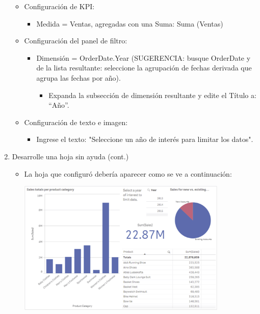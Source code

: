 \documentclass[12pt,letterpaper]{article}
\begin{document}
\begin{enumerate}
\begin{itemize}
\begin{itemize}
        \end{itemize}   
        \item Configuración de KPI:
        \begin{itemize}
            \item Medida = Ventas, agregadas con una Suma: Suma (Ventas)
        \end{itemize} 
        \item Configuración del panel de filtro:
        \begin{itemize}    
            \item Dimensión = OrderDate.Year (SUGERENCIA: busque OrderDate y de la lista resultante: seleccione la agrupación de fechas derivada que agrupa las fechas por año).
            \begin{itemize}      
                \item Expanda la subsección de dimensión resultante y edite el Título a: “Año”.
            \end{itemize} 
        \end{itemize} 
        \item Configuración de texto e imagen:
        \begin{itemize}  
            \item Ingrese el texto: "Seleccione un año de interés para limitar los datos".
        \end{itemize} 
    \end{itemize}  
    \item Desarrolle una hoja sin ayuda (cont.)
    \begin{itemize}  
        \item La hoja que configuró debería aparecer como se ve a continuación:
        \begin{center}
            \includegraphics[width=10cm]{./img/image11.png} 
        \end{center}
    \end{itemize} 

\end{enumerate}
\end{document}
